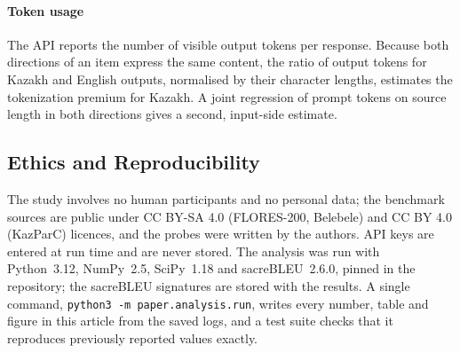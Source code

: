 \paragraph*{Token usage} The API reports the number of visible output tokens per response. Because both directions of an item express the same content, the ratio of output tokens for Kazakh and English outputs, normalised by their character lengths, estimates the tokenization premium for Kazakh. A joint regression of prompt tokens on source length in both directions gives a second, input-side estimate.

\subsection{Ethics and Reproducibility}
The study involves no human participants and no personal data; the benchmark sources are public under CC BY-SA 4.0 (FLORES-200, Belebele) and CC BY 4.0 (KazParC) licences, and the probes were written by the authors. API keys are entered at run time and are never stored. The analysis was run with Python~3.12, NumPy~2.5, SciPy~1.18 and sacreBLEU~2.6.0, pinned in the repository; the sacreBLEU signatures are stored with the results. A single command, \texttt{python3 -m paper.analysis.run}, writes every number, table and figure in this article from the saved logs, and a test suite checks that it reproduces previously reported values exactly.
